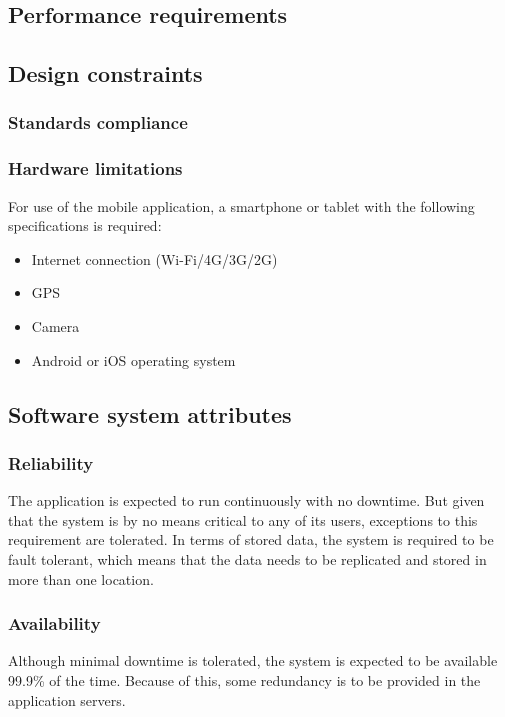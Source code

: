 \subsection{Performance requirements}

\subsection{Design constraints}

\subsubsection{Standards compliance}

\subsubsection{Hardware limitations}

For use of the mobile application, a smartphone or tablet with the following specifications is required:
\begin{itemize}
   \item 
    Internet connection (Wi-Fi/4G/3G/2G)
   \item 
    GPS
   \item 
    Camera
   \item 
    Android or iOS operating system
\end{itemize}


\subsection{Software system attributes}
\subsubsection{Reliability}
The application is expected to run continuously with no downtime. But given that the system is by no means critical to any of its users, exceptions to this requirement are tolerated. In terms of stored data, the system is required to be fault tolerant, which means that the data needs to be replicated and stored in more than one location.

\subsubsection{Availability}
Although minimal downtime is tolerated, the system is expected to be available 99.9\% of the time. Because of this, some redundancy is to be provided in the application servers.

